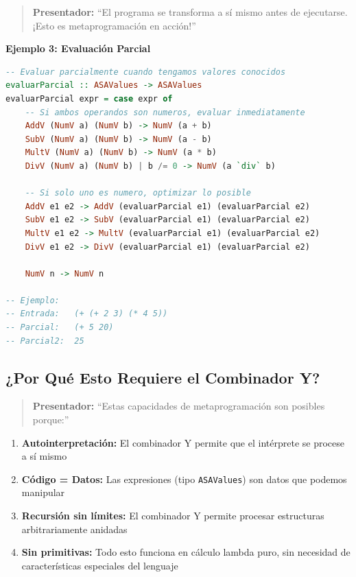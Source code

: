 \documentclass[12pt]{article}
\begin{document}
\begin{quote}
\textbf{Presentador:} ``El programa se transforma a sí mismo antes de ejecutarse. ¡Esto es metaprogramación en acción!''
\end{quote}

\textbf{Ejemplo 3: Evaluación Parcial}

\begin{lstlisting}[language=Haskell, caption=Evaluacion parcial con conocimiento en tiempo de compilacion]
-- Evaluar parcialmente cuando tengamos valores conocidos
evaluarParcial :: ASAValues -> ASAValues
evaluarParcial expr = case expr of
    -- Si ambos operandos son numeros, evaluar inmediatamente
    AddV (NumV a) (NumV b) -> NumV (a + b)
    SubV (NumV a) (NumV b) -> NumV (a - b)
    MultV (NumV a) (NumV b) -> NumV (a * b)
    DivV (NumV a) (NumV b) | b /= 0 -> NumV (a `div` b)

    -- Si solo uno es numero, optimizar lo posible
    AddV e1 e2 -> AddV (evaluarParcial e1) (evaluarParcial e2)
    SubV e1 e2 -> SubV (evaluarParcial e1) (evaluarParcial e2)
    MultV e1 e2 -> MultV (evaluarParcial e1) (evaluarParcial e2)
    DivV e1 e2 -> DivV (evaluarParcial e1) (evaluarParcial e2)

    NumV n -> NumV n

-- Ejemplo:
-- Entrada:   (+ (+ 2 3) (* 4 5))
-- Parcial:   (+ 5 20)
-- Parcial2:  25
\end{lstlisting}

\subsection*{¿Por Qué Esto Requiere el Combinador Y?}

\begin{quote}
\textbf{Presentador:} ``Estas capacidades de metaprogramación son posibles porque:''
\end{quote}

\begin{enumerate}
\item \textbf{Autointerpretación:} El combinador Y permite que el intérprete se procese a sí mismo

\item \textbf{Código = Datos:} Las expresiones (tipo \texttt{ASAValues}) son datos que podemos manipular

\item \textbf{Recursión sin límites:} El combinador Y permite procesar estructuras arbitrariamente anidadas

\item \textbf{Sin primitivas:} Todo esto funciona en cálculo lambda puro, sin necesidad de características especiales del lenguaje
\end{enumerate}
\end{document}
